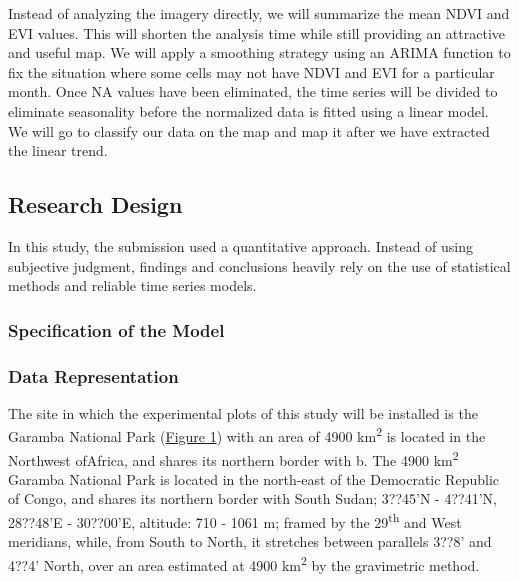 \documentclass[
  letterpaper,
  DIV=11,
  numbers=noendperiod]{scrartcl}
\begin{document}
Instead of analyzing the imagery directly, we will summarize the mean
NDVI and EVI values. This will shorten the analysis time while still
providing an attractive and useful map. We will apply a smoothing
strategy using an ARIMA function to fix the situation where some cells
may not have NDVI and EVI for a particular month. Once NA values have
been eliminated, the time series will be divided to eliminate
seasonality before the normalized data is fitted using a linear model.
We will go to classify our data on the map and map it after we have
extracted the linear trend.

\hypertarget{research-design}{%
\subsection{Research Design}\label{research-design}}

In this study, the submission used a quantitative approach. Instead of
using subjective judgment, findings and conclusions heavily rely on the
use of statistical methods and reliable time series models.

\hypertarget{specification-of-the-model}{%
\subsubsection{Specification of the
Model}\label{specification-of-the-model}}

\hypertarget{data-representation}{%
\subsubsection{Data Representation}\label{data-representation}}

The site in which the experimental plots of this study will be installed
is the Garamba National Park
(\href{https://www.scirp.org/journal/paperinformation.aspx?paperid=112855\#f1}{Figure
1}) with an area of 4900 km\textsuperscript{2} is located in the
Northwest ofAfrica, and shares its northern border with b. The 4900
km\textsuperscript{2} Garamba National Park is located in the north-east
of the Democratic Republic of Congo, and shares its northern border with
South Sudan; 3??45'N - 4??41'N, 28??48'E - 30??00'E, altitude: 710 -
1061 m; framed by the 29\textsuperscript{th} and West meridians, while,
from South to North, it stretches between parallels 3??8' and 4??4'
North, over an area estimated at 4900 km\textsuperscript{2} by the
gravimetric method.

\hypertarget{section}{%
\subsubsection{}\label{section}}
\end{document}
